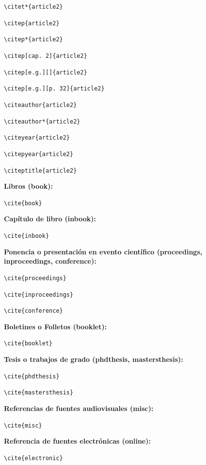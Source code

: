 \documentclass{uclamsc}
\begin{document}
\begin{contenido}
\verb;\citet*{article2}; \citet*{article2}

\verb;\citep{article2}; \citep{article2}

\verb;\citep*{article2}; \citep*{article2}

\verb;\citep[cap. 2]{article2}; \citep[cap. 2]{article2}

\verb;\citep[e.g.][]{article2}; \citep[e.g.][]{article2}

\verb;\citep[e.g.][p. 32]{article2}; \citep[e.g.][p. 32]{article2}

\verb;\citeauthor{article2}; \citeauthor{article2}

\verb;\citeauthor*{article2}; \citeauthor*{article2}

\verb;\citeyear{article2}; \citeyear{article2}

\verb;\citepyear{article2}; 

\verb;\citeptitle{article2}; 

\espaciodoble\textbf{Libros (book):}

\verb;\cite{book}; \cite{book}

\espaciodoble\textbf{Capítulo de libro (inbook):}

\verb;\cite{inbook}; \cite{inbook}

\espaciodoble\textbf{Ponencia o presentación en evento científico (proceedings, inproceedings, conference):}

\verb;\cite{proceedings}; \cite{proceedings}

\verb;\cite{inproceedings}; \cite{inproceedings}

\verb;\cite{conference}; \cite{conference}

\espaciodoble\textbf{Boletines o Folletos (booklet):}

\verb;\cite{booklet}; \cite{booklet}

\espaciodoble\textbf{Tesis o trabajos de grado (phdthesis, mastersthesis):}

\verb;\cite{phdthesis}; \cite{phdthesis}

\verb;\cite{mastersthesis}; \cite{mastersthesis}

\espaciodoble\textbf{Referencias de fuentes audiovisuales (misc):}

\verb;\cite{misc}; \cite{misc}

\espaciodoble\textbf{Referencia de fuentes electrónicas (online):}

\verb;\cite{electronic}; \cite{electronic}

\break


\end{contenido}
\end{document}
